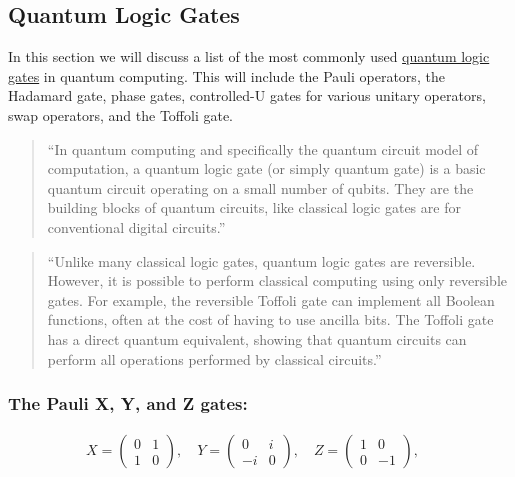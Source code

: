\documentclass[11pt]{article}
\begin{document}
    \hypertarget{quantum-logic-gates}{%
\subsection{Quantum Logic Gates}\label{quantum-logic-gates}}

    In this section we will discuss a list of the most commonly used
\href{https://en.wikipedia.org/wiki/Quantum_logic_gate\#Square_root_of_NOT_gate_(\%E2\%88\%9ANOT)}{quantum
logic gates} in quantum computing. This will include the Pauli
operators, the Hadamard gate, phase gates, controlled-U gates for
various unitary operators, swap operators, and the Toffoli gate.

\begin{quote}
``In quantum computing and specifically the quantum circuit model of
computation, a quantum logic gate (or simply quantum gate) is a basic
quantum circuit operating on a small number of qubits. They are the
building blocks of quantum circuits, like classical logic gates are for
conventional digital circuits.''
\end{quote}

\begin{quote}
``Unlike many classical logic gates, quantum logic gates are reversible.
However, it is possible to perform classical computing using only
reversible gates. For example, the reversible Toffoli gate can implement
all Boolean functions, often at the cost of having to use ancilla bits.
The Toffoli gate has a direct quantum equivalent, showing that quantum
circuits can perform all operations performed by classical circuits.''
\end{quote}

    \hypertarget{the-pauli-x-y-and-z-gates}{%
\subsubsection{The Pauli X, Y, and Z
gates:}\label{the-pauli-x-y-and-z-gates}}

\begin{align}
X = \begin{pmatrix} 0&1 \\ 1&0 \end{pmatrix}, \quad
Y = \begin{pmatrix} 0&i \\ -i&0 \end{pmatrix}, \quad
Z = \begin{pmatrix} 1&0 \\ 0&-1 \end{pmatrix}, \quad
\end{align}
\end{document}
